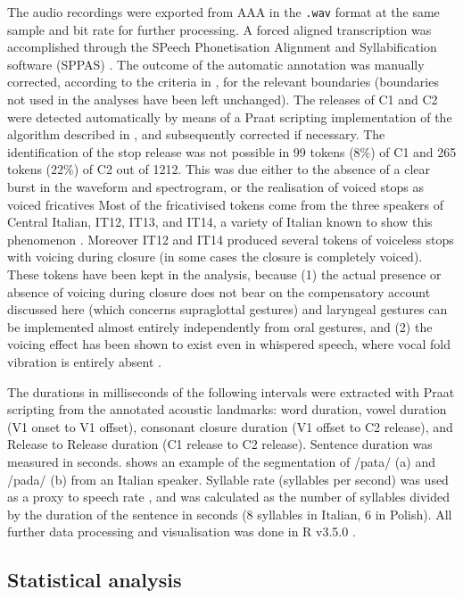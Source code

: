 \documentclass[12pt,]{article}
\begin{document}
The audio recordings were exported from AAA in the \texttt{.wav} format
at the same sample and bit rate for further processing. A forced aligned
transcription was accomplished through the SPeech Phonetisation
Alignment and Syllabification software (SPPAS) \citep{bigi2015}. The
outcome of the automatic annotation was manually corrected, according to
the criteria in , for the relevant boundaries
(boundaries not used in the analyses have been left unchanged). The
releases of C1 and C2 were detected automatically by means of a Praat
scripting implementation of the algorithm described in
\citet{ananthapadmanabha2014}, and subsequently corrected if necessary.
The identification of the stop release was not possible in 99 tokens
(8\%) of C1 and 265 tokens (22\%) of C2 out of 1212. This was due either
to the absence of a clear burst in the waveform and spectrogram, or the
realisation of voiced stops as voiced fricatives Most of the
fricativised tokens come from the three speakers of Central Italian,
IT12, IT13, and IT14, a variety of Italian known to show this phenomenon
\citealt{hualde2011}. Moreover IT12 and IT14 produced several tokens of
voiceless stops with voicing during closure (in some cases the closure
is completely voiced). These tokens have been kept in the analysis,
because (1) the actual presence or absence of voicing during closure
does not bear on the compensatory account discussed here (which concerns
supraglottal gestures) and laryngeal gestures can be implemented almost
entirely independently from oral gestures, and (2) the voicing effect
has been shown to exist even in whispered speech, where vocal fold
vibration is entirely absent \citep{sharf1964}.

The durations in milliseconds of the following intervals were extracted
with Praat scripting from the annotated acoustic landmarks: word
duration, vowel duration (V1 onset to V1 offset), consonant closure
duration (V1 offset to C2 release), and Release to Release duration (C1
release to C2 release). Sentence duration was measured in seconds.
 shows an example of the segmentation of /pata/ (a)
and /pada/ (b) from an Italian speaker. Syllable rate (syllables per
second) was used as a proxy to speech rate \citep{plug2018}, and was
calculated as the number of syllables divided by the duration of the
sentence in seconds (8 syllables in Italian, 6 in Polish). All further
data processing and visualisation was done in R v3.5.0
\citep{r-core-team2018, wickham2017}.

\hypertarget{statistical-analysis}{%
\subsection{Statistical analysis}\label{statistical-analysis}}
\end{document}
